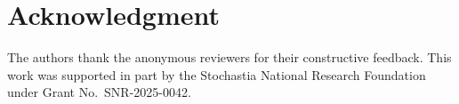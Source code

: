 \documentclass[journal]{IEEEtran}
\begin{document}
\section*{Acknowledgment}
The authors thank the anonymous reviewers for their constructive feedback. This work was supported in part by the Stochastia National Research Foundation under Grant No.\ SNR-2025-0042.



\end{document}
